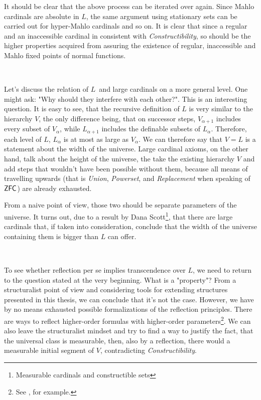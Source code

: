 \documentclass[12pt,a4paper]{article}
\begin{document}
It should be clear that the above process can be iterated over again. Since Mahlo cardinals are absolute in $L$, the same argument using stationary sets can be carried out for hyper-Mahlo cardinals and so on. It is clear that since a regular and an inaccessible cardinal in consistent with \emph{Constructibility}, so should be the higher properties acquired from assuring the existence of regular, inaccessible and Mahlo fixed points of normal functions.

\

Let's discuss the relation of $L$ and large cardinals on a more general level. One might ask: "Why should they interfere with each other?". This is an interesting question. It is easy to see, that the recursive definition of $L$ is very similar to the hierarchy $V$, the only difference being, that on successor steps, $V_{\alpha+1}$ includes every subset of $V_\alpha$, while $L_{\alpha+1}$ includes the definable subsets of $L_\alpha$. Therefore, each level of $L$, $L_\alpha$ is at most as large as $V_\alpha$. We can therefore say that $V = L$ is a statement about the width of the universe. Large cardinal axioms, on the other hand, talk about the height of the universe, the take the existing hierarchy $V$ and add steps that wouldn't have been possible without them, because all means of travelling upwards (that is \emph{Union}, \emph{Powerset}, and \emph{Replacement} when speaking of $\sf{ZFC}$) are already exhausted. 

From a naive point of view, those two should be separate parameters of the universe. It turns out, due to a result by Dana Scott\footnote{Measurable cardinals and constructible sets %
}, that there are large cardinals that, if taken into consideration, conclude that the width of the universe containing them is bigger than $L$ can offer.

\

To see whether reflection per se implies transcendence over $L$, we need to return to the question stated at the very beginning. What is a "property"? From a structuralist point of view and considering tools for extending structures presented in this thesis, we can conclude that it's not the case. However, we have by no means exhausted possible formalizations of the reflection principles. There are ways to reflect higher-order formulas with higher-order parameters\footnote{See \cite{Welch12globalreflection}, for example.}. We can also leave the structuralist mindset and try to find %
a way to justify the fact, that the universal class is measurable, then, also by a reflection, there would a measurable initial segment of $V$, contradicting \emph{Constructibility}.
\end{document}
